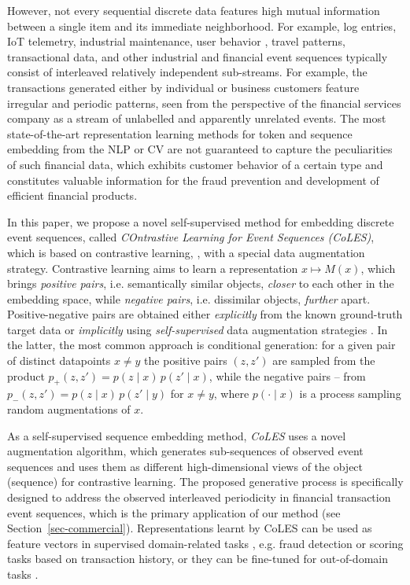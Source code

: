 \documentclass[sigconf]{acmart}
\begin{document}
However, not every sequential discrete data features high mutual information between a single
item and its immediate neighborhood. For example, log entries, IoT telemetry, industrial
maintenance, user behavior \citep{Ni2018PerceiveYU}, travel patterns, transactional data,
and other industrial and financial event sequences typically consist of interleaved relatively
independent sub-streams.
%
For example, the transactions generated either by individual or business customers feature
irregular and periodic patterns, seen from the perspective of the financial services company
as a stream of unlabelled and apparently unrelated events. The most state-of-the-art
representation learning methods for token and sequence embedding from the NLP or CV are
not guaranteed to capture the peculiarities of such financial data, which exhibits customer
behavior of a certain type and constitutes valuable information for the fraud prevention
and development of efficient financial products.

In this paper, we propose a novel self-supervised method for embedding discrete event
sequences, called \emph{COntrastive Learning for Event Sequences (CoLES)}, which is based
on contrastive learning, \citep{Xing2002DistanceML, Hadsell2006DimensionalityRB}, with
a special data augmentation strategy.
% 
Contrastive learning aims to learn a representation $x \mapsto M(x)$, which brings
\emph{positive pairs}, i.e. semantically similar objects, \emph{closer} to each other
in the embedding space, while \emph{negative pairs}, i.e. dissimilar objects, \emph{further}
apart.
%
Positive-negative pairs are obtained either \emph{explicitly} from the known ground-truth
target data or \emph{implicitly} using \emph{self-supervised} data augmentation strategies
\citep{Falcon2020AFF}. In the latter, the most common approach is conditional generation:
for a given pair of distinct datapoints $x \neq y$ the positive pairs $(z, z')$ are sampled
from the product $
  p_+(z, z') = p(z \mid x) \,p(z' \mid x) 
$, while the negative pairs -- from $
  p_-(z, z') = p(z \mid x) \,p(z' \mid y)
$ for $x \neq y$, where $
  p(\cdot \mid x)
$ is a process sampling random augmentations of $x$.

As a self-supervised sequence embedding method, \emph{CoLES} uses a novel augmentation
algorithm, which generates sub-sequences of observed event sequences and uses them as
different high-dimensional views of the object (sequence) for contrastive learning.
%
The proposed generative process is specifically designed to address the observed interleaved
periodicity in financial transaction event sequences, which is the primary application of
our method (see Section~\ref{sec-commercial}).
Representations learnt by CoLES can be used as feature vectors
in supervised domain-related tasks \citep{Mikolov2013EfficientEO,Song2017LearningUE,Zhai2019LearningAU},
e.g. fraud detection or scoring tasks based on transaction history, or they can be fine-tuned
for out-of-domain tasks \citep{Yosinski2014HowTA}.
\end{document}
